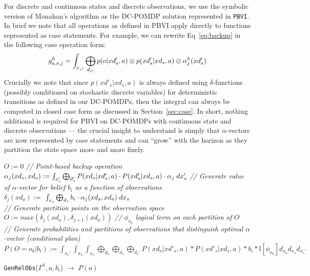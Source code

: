 \documentclass{article} %
\begin{document}
For discrete and continuous states and discrete observations, we use the symbolic version of Monahan's algorithm as the DC-POMDP solution represented in \texttt{PBVI}.  In brief we note that all operations as defined in PBVI apply directly to functions represented as case statements.  For example, we can rewrite
Eq~\eqref{eq:backup} in the following case operation form:
{\footnotesize
\begin{align}
g^h_{a,o,j} =  \int_{x_{s'}} \large \bigoplus_{d_{s'}} p(o|xd'_s,a) \otimes p(xd'_s|xd_s,a) \otimes \alpha^h_j(xd'_s) \nonumber
\end{align}
}
Crucially we note that since $p(xd'_s|xd_s,a)$ is always defined using $\delta$-functions (possibly conditioned on stochastic discrete variables) for deterministic transitions as defined in our DC-POMDPs, then the integral can always be computed in closed case form as discussed in Section~\ref{sec:case}.
In short, nothing additional is required for PBVI on DC-POMDPs
with continuous state and discrete observations --- the crucial insight
to understand is simply that $\alpha$-vectors are now represented by
case statements and can ``grow'' with the horizon as they partition the
state space more and more finely.
\incmargin{.5em}
\linesnumbered
\begin{algorithm}[t!]
\vspace{-.5mm}
\dontprintsemicolon
{}

\Begin
{
	$O:=0$ \;	
		{
		\emph{// Point-based backup operation}\\
    	$\alpha_j(xd_s,xd_o) := \int_{x_s'} \bigoplus_{d_s'} P(xd_{o}|xd'_{s},a) \cdot P(xd'_{s}| xd_{s},a)\cdot \alpha_j \hspace{1mm}dx_s'$\;
		}  
		{
		\emph{// Generate value of $\alpha$-vector for belief $b_i$ as a function of observations}\\
		$\delta_{j}(xd_o) := $ $\int_{x_{s}} \bigoplus_{d_s} b_i \cdot \alpha_j(xd_s,xd_o)\hspace{1mm}dx_s$\\ \;
		}
		{
		\emph{// Generate partition points on the observation space}\\
		$O := max(\delta_j(xd_o),\delta_{j+1}(xd_o))$\;
    	}
    	\emph{// $\phi_{o_k}$ logical term on each partition of $O$}\\
    	\emph{// Generate probabilities and partitions of observations that distinguish optimal $\alpha$-vector (conditional plan)}\\
   		$P(O=o_k|b_i) := \int_{x_s'} \int_{x_o} \int_{x_s} \bigoplus_{d_o} \bigoplus_{d_s} \bigoplus_{d_s'} P(xd_o|xd'_s,a)*P(xd'_s|xd_s,a)*b_i* \mathbb{I}[\phi_{o_k}] d_{x_o} d_{x_s}d_{x_s'}$ \;
     \;
}
\caption{\footnotesize \texttt{GenRelObs}($\Gamma^h,a,b_i$) $\longrightarrow$ $P(o)$ }
\label{alg:genrelobs}
\vspace{-1mm}
\end{algorithm}
\decmargin{.5em}
\end{document}
